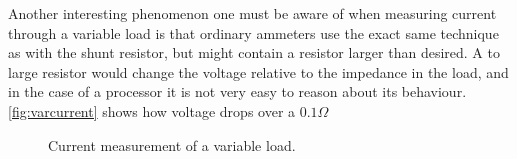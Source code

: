 Another interesting phenomenon one must be aware of when measuring current
through a variable load is that ordinary ammeters use the exact same technique
as with the shunt resistor, but might contain a resistor larger than desired. A
to large resistor would change the voltage relative to the impedance in the
load, and in the case of a processor it is not very easy to reason about its
behaviour. \autoref{fig:varcurrent} shows how voltage drops over a $0.1 \Omega$

\begin{figure}[tbh]
    \centering
    
    \caption{Current measurement of a variable load.}
    \label{fig:varcurrent}
\end{figure}


